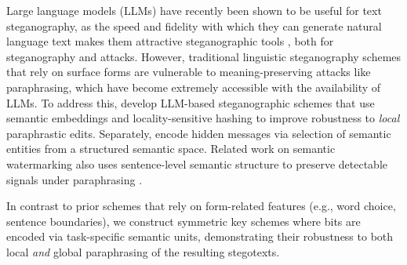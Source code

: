 





Large language models (LLMs) have recently been shown to be useful for text steganography, as the speed and fidelity with which they can generate natural language text makes them attractive steganographic tools \citep{kaptchuk2021meteor,zamir2024undetectable,wu2024generative,perry2025robust}, both for steganography and attacks. However, traditional linguistic steganography schemes that rely on surface forms are vulnerable to meaning-preserving attacks like paraphrasing, which have become extremely accessible with the availability of LLMs. To address this, \citet{perry2025robust} develop LLM-based steganographic schemes that use semantic embeddings and locality-sensitive hashing to improve robustness to \emph{local} paraphrastic edits. Separately, \citet{bai2024semantic} encode hidden messages via selection of semantic entities from a structured semantic space. Related work on semantic watermarking also uses sentence-level semantic structure to preserve detectable signals under paraphrasing \cite{hou-etal-2024-semstamp, hou-etal-2024-k}.

In contrast to prior schemes that rely on form-related features (e.g., word choice, sentence boundaries), we construct symmetric key schemes where bits are encoded via task-specific semantic units, demonstrating their robustness to both local \emph{and} global paraphrasing of the resulting stegotexts.
